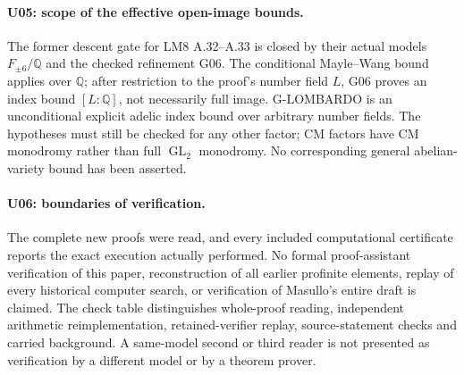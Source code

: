 \paragraph{U05: scope of the effective open-image bounds.}
The former descent gate for LM8 A.32--A.33 is closed by their actual
models $F_{\pm6}/\mathbb Q$ and the checked refinement G06.
The conditional Mayle--Wang bound applies over $\mathbb Q$; after
restriction to the proof's number field $L$, G06 proves an index
bound $[L:\mathbb Q]$, not necessarily full image.
G-LOMBARDO is an unconditional explicit adelic index bound over
arbitrary number fields. The hypotheses must still be checked for
any other factor; CM factors have CM monodromy rather than full
$\operatorname{GL}_2$ monodromy. No corresponding general abelian-variety
bound has been asserted.

\paragraph{U06: boundaries of verification.}
The complete new proofs were read, and every included computational
certificate reports the exact execution actually performed. No
formal proof-assistant verification of this paper, reconstruction
of all earlier profinite elements, replay of every historical
computer search, or verification of Masullo's entire draft is
claimed. The check table distinguishes whole-proof reading,
independent arithmetic reimplementation, retained-verifier replay,
source-statement checks and carried background. A same-model second
or third reader is not presented as verification by a different
model or by a theorem prover.
